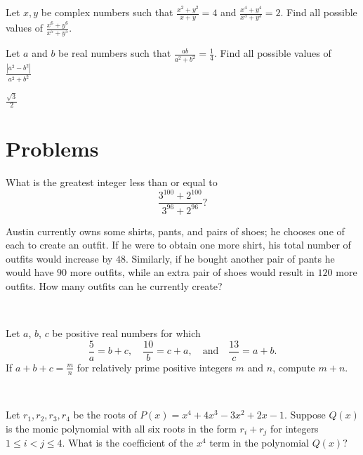 \documentclass{article}
\begin{document}
\begin{exam}
Let $x,y$ be complex numbers such that $\frac{x^2+y^2}{x+y} = 4$ and $\frac{x^4+y^4}{x^3+y^3} = 2$. Find all possible values of 
$\frac{x^6+y^6}{x^5+y^5}$.
\end{exam}

\begin{exam}
Let $a$ and $b$ be real numbers such that $\frac{ab}{a^2+b^2}=\frac{1}{4}$. Find all possible values of $\frac{|a^2-b^2|}{a^2+b^2}$
\end{exam}

\begin{sol}
$\boxed{\frac{\sqrt{3}}{2}}$
\end{sol}


\pagebreak\section{Problems}

\minpt{}


\begin{prob}[AMC 10A 2018/14]{2}
What is the greatest integer less than or equal to\[\frac{3^{100}+2^{100}}{3^{96}+2^{96}}?\]
\end{prob}

\begin{prob}[2008-2009 Mandelbrot]{3}
Austin currently owns some shirts, pants, and pairs of shoes; he chooses one of each to create an outfit. If he were to obtain one more shirt, his total number of outfits would increase by $48.$ Similarly, if he bought another pair of pants he would have $90$ more outfits, while an extra pair of shoes would result in $120$ more outfits. How many outfits can he currently create?
\end{prob}
  \\

\begin{prob}{4}
Let $a$, $b$, $c$ be positive real numbers for which \[
  \frac{5}{a} = b+c, \quad
  \frac{10}{b} = c+a, \quad \text{and} \quad
  \frac{13}{c} = a+b. \] If $a+b+c = \frac mn$ for relatively prime positive integers $m$ and $n$, compute $m+n$.
\end{prob}
  \\
  
\begin{prob}[JMC 10 2021/22]{5}
Let $r_1,r_2,r_3,r_4$ be the roots of $P(x)= x^4+4x^3-3x^2+2x-1.$ Suppose $Q(x)$ is the monic polynomial with all six roots in the form $r_{i}+r_{j}$ for integers $1\le i < j \le 4.$ What is the coefficient of the $x^4$ term in the polynomial $Q(x)?$
\end{prob}
\end{document}
